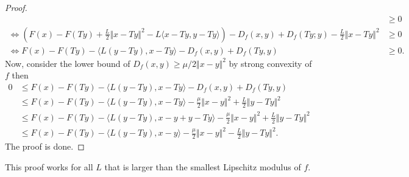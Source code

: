 \documentclass[12pt]{article}
\begin{document}
\begin{proof}
{\begin{align*}
            &\ge 0
            \\
            \iff
            \left(
                F(x) - F(Ty) + \frac{L}{2}\Vert x - Ty\Vert^2 
                - L\langle  x - Ty, y - Ty\rangle
            \right)
            - D_f(x, y) 
            + D_f(Ty; y)
            - \frac{L}{2}\Vert x - Ty\Vert^2
            &\ge 0
            \\
            \iff 
            F(x) - F(Ty)
            - \langle L(y - Ty), x - Ty\rangle
            - D_f(x, y) 
            + D_f(Ty, y)
            &\ge 0. 
        \end{align*}
        }
        Now, consider the lower bound of $D_f(x, y) \ge \mu/2\Vert x - y\Vert^2$ by strong convexity of $f$ then 
        \begin{align*}
            0 &\le 
            F(x) - F(Ty)
            - \langle L(y - Ty), x - Ty\rangle
            - D_f(x, y) 
            + D_f(Ty, y)
            \\
            &\le 
            F(x) - F(Ty)
            - \langle L(y - Ty), x - Ty\rangle
            - \frac{\mu}{2}\Vert x - y\Vert^2
            + \frac{L}{2}\Vert y - Ty\Vert^2
            \\
            &\le 
            F(x) - F(Ty)
            - \langle L(y - Ty), x - y  + y - Ty\rangle
            - \frac{\mu}{2}\Vert x - y\Vert^2
            + \frac{L}{2}\Vert y - Ty\Vert^2
            \\
            &\le 
            F(x) - F(Ty) - \langle L(y - Ty), x - y\rangle - \frac{\mu}{2}\Vert x - y \Vert^2
            - \frac{L}{2}\Vert y - Ty\Vert^2. 
        \end{align*}
        The proof is done. 
    \end{proof}
    \begin{remark}
        This proof works for all $L$ that is larger than the smallest Lipschitz modulus of $f$. 
    \end{remark}
\end{document}
